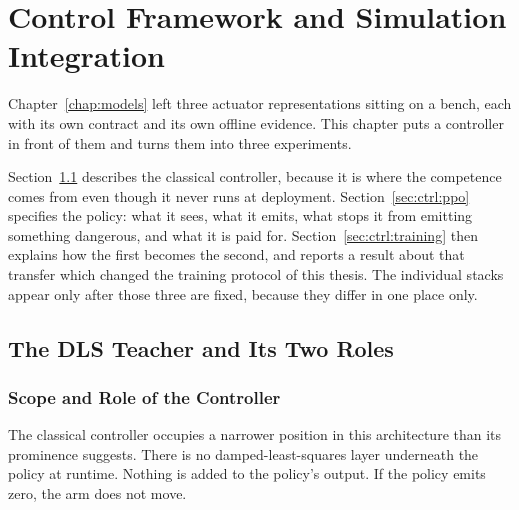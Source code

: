 \chapter{Control Framework and Simulation Integration}
\label{chap:control}

Chapter~\ref{chap:models} left three actuator representations sitting on a
bench, each with its own contract and its own offline evidence. This chapter
puts a controller in front of them and turns them into three experiments.

Section~\ref{sec:ctrl:dls} describes the classical
controller, because it is where the competence comes from even though it never
runs at deployment. Section~\ref{sec:ctrl:ppo} specifies the policy: what it
sees, what it emits, what stops it from emitting something dangerous, and what
it is paid for. Section~\ref{sec:ctrl:training} then explains how the first
becomes the second, and reports a result about that transfer which changed the
training protocol of this thesis. The individual stacks appear only after those three are fixed, because
they differ in one place only.

\section{The DLS Teacher and Its Two Roles}
\label{sec:ctrl:dls}

\subsection{Scope and Role of the Controller}

The classical controller occupies a narrower position in this
architecture than its prominence suggests. There is no
damped-least-squares layer underneath the policy at runtime. Nothing is added
to the policy's output. If the policy emits zero, the arm does not move.

